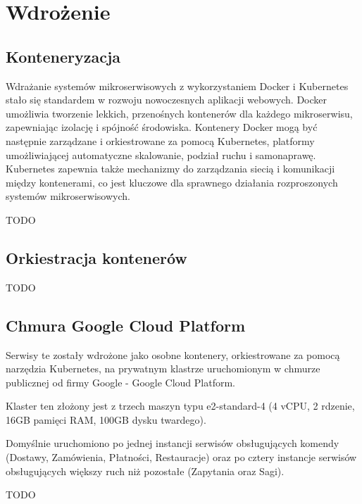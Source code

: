 \clearpage %

\section{Wdrożenie}

\subsection{Konteneryzacja}

Wdrażanie systemów mikroserwisowych z wykorzystaniem Docker i Kubernetes stało się standardem w rozwoju nowoczesnych aplikacji webowych. Docker umożliwia tworzenie lekkich, przenośnych kontenerów dla każdego mikroserwisu, zapewniając izolację i spójność środowiska. Kontenery Docker mogą być następnie zarządzane i orkiestrowane za pomocą Kubernetes, platformy umożliwiającej automatyczne skalowanie, podział ruchu  i samonaprawę. Kubernetes zapewnia także mechanizmy do zarządzania siecią i komunikacji między kontenerami, co jest kluczowe dla sprawnego działania rozproszonych systemów mikroserwisowych.

TODO

\subsection{Orkiestracja kontenerów}

TODO

\subsection{Chmura Google Cloud Platform}

Serwisy te zostały wdrożone jako osobne kontenery, orkiestrowane za pomocą narzędzia Kubernetes, na prywatnym klastrze uruchomionym w chmurze publicznej od firmy Google - Google Cloud Platform.

Klaster ten złożony jest z trzech maszyn typu e2-standard-4 (4 vCPU, 2 rdzenie, 16GB pamięci RAM, 100GB dysku twardego).

Domyślnie uruchomiono po jednej instancji serwisów obsługujących komendy (Dostawy, Zamówienia, Płatności, Restauracje) oraz po cztery instancje serwisów obsługujących większy ruch niż pozostałe (Zapytania oraz Sagi).

TODO